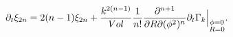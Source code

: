 \begin{equation}
\label{eq:beta.xi}
\partial_t \xi_{2n}=
2(n-1)\xi_{2n}+{k^{2(n-1)}\over Vol}{1\over n!}
{\partial^{n+1}\over \partial R\partial (\phi^2)^n}\partial_t \Gamma_k \Big|_{\substack{\phi=0\\ R=0}}.
\end{equation}

